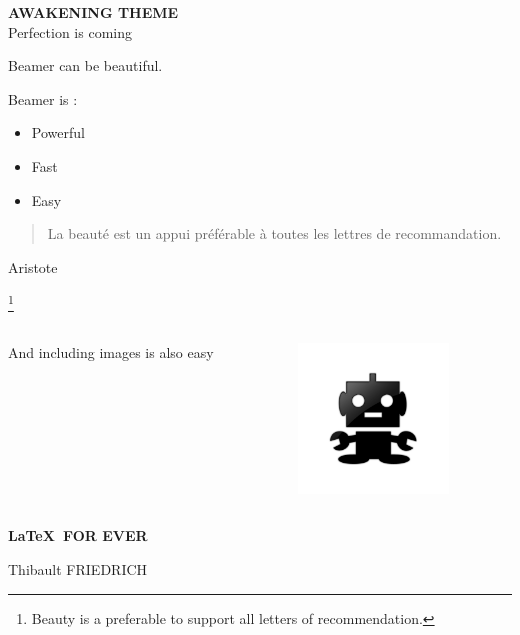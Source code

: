 \documentclass[20pt]{beamer}  %
\title{\preztitle}
\author{}
\date{}
\newcommand{\preztitle}{\bf AWAKENING THEME}
\newcommand{\prezsubtitle}{Perfection is coming}
\renewcommand{\titlepage}{\begin{center}{\large \preztitle}\\{\small \color{subgray}
\prezsubtitle}\end{center}}
\begin{document}
\centering
{}

\begin{frame}
   \titlepage 
\end{frame}


\begin{frame} %
    Beamer can be beautiful.
\end{frame}
\begin{frame} %
    Beamer is :
    \begin{itemize}
        \item <2-> Powerful
        \item <3-> Fast
        \item <4-> Easy 
\end{itemize}
\end{frame}
\begin{frame} %
    \begin{quotation}
        La beauté est un appui préférable à toutes les lettres de recommandation.
\end{quotation}
\begin{minipage}[t]{.6\textwidth}
\raggedleft%
\small Aristote
\end{minipage}\footnote{Beauty is a
    preferable to support
    all letters of
recommendation.}
\end{frame}
\begin{frame}
\end{frame}

\begin{frame}
        \begin{columns}
        \begin{column}{4cm}
            \begin{flushright}
            And including images is also easy
                
            \end{flushright}
        \end{column}
        \begin{column}{4cm}
            \vspace{1cm}
        \includegraphics[width=4cm]{robot.png}
        \end{column}
        \end{columns}
\end{frame}

\begin{frame}
    \textbf{\large \LaTeX \ FOR EVER}

    {\tiny \color{subgray} Thibault FRIEDRICH}
\end{frame}
\end{document}
